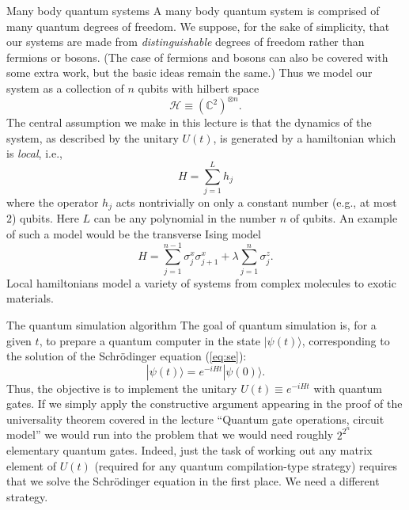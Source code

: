 \documentclass[12pt,oneside]{amsart}
\makeatletter
\def\subsection{\@startsection{subsection}{2}%
  \z@{.5\linespacing\@plus.7\linespacing}{-.5em}%
  {\color{cgblue}\normalfont\sf\bfseries}}
\theoremstyle{plain}%
\theoremstyle{definition}
\theoremstyle{remark}
\makeatother
\begin{document}
\subsection{Many body quantum systems}
A many body quantum system is comprised of many quantum degrees of freedom. We suppose, for the sake of simplicity, that our systems are made from \emph{distinguishable} degrees of freedom rather than fermions or bosons. (The case of fermions and bosons can also be covered with some extra work, but the basic ideas remain the same.) Thus we model our system as a collection of $n$ qubits with hilbert space
\begin{equation}
  \mathcal{H}\equiv (\mathbb{C}^2)^{\otimes n}.
\end{equation}
The central assumption we make in this lecture is that the dynamics of the system, as described by the unitary $U(t)$, is generated by a hamiltonian which is \emph{local}, i.e., 
\begin{equation}
  H = \sum_{j=1}^L h_j
\end{equation}
where the operator $h_j$ acts nontrivially on only a constant number (e.g., at most $2$) qubits. Here $L$ can be any polynomial in the number $n$ of qubits. An example of such a model would be the transverse Ising model
\begin{equation} 
  H = \sum_{j=1}^{n-1} \sigma^x_j\sigma_{j+1}^x + \lambda \sum_{j=1}^n \sigma_j^z.
\end{equation}
Local hamiltonians model a variety of systems from complex molecules to exotic materials. 

\subsection{The quantum simulation algorithm}
The goal of quantum simulation is, for a given $t$, to prepare a quantum computer in the state $|\psi(t)\rangle$, corresponding to the solution of the Schrödinger equation (\ref{eq:se}):
\begin{equation}
  |\psi(t)\rangle = e^{-iHt}|\psi(0)\rangle.
\end{equation}
Thus, the objective is to implement the unitary $U(t) \equiv e^{-iHt}$ with quantum gates. If we simply apply the constructive argument appearing in the proof of the universality theorem covered in the lecture ``Quantum gate operations, circuit model'' we would run into the problem that we would need roughly $2^{2^n}$ elementary quantum gates. Indeed, just the task of working out any matrix element of $U(t)$ (required for any quantum compilation-type strategy) requires that we solve the Schrödinger equation in the first place. We need a different strategy. 
\end{document}
